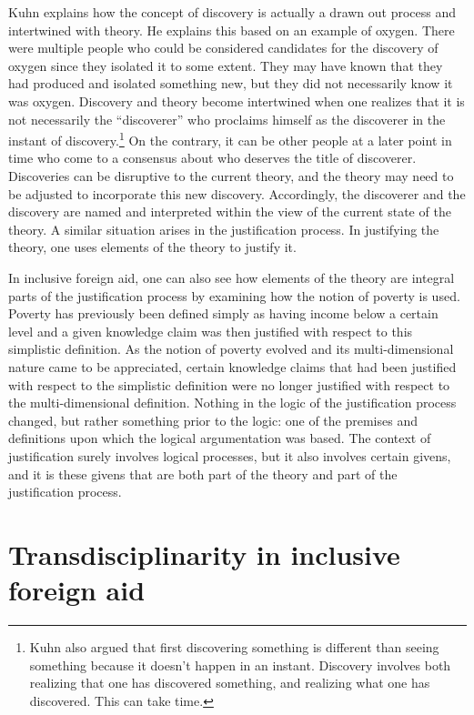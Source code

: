 \documentclass[a4paper]{article}
\begin{document}
Kuhn explains how the concept of discovery is actually a drawn out process and
intertwined with theory. He explains this based on an example of oxygen. There
were multiple people who could be considered candidates for the discovery of
oxygen since they isolated it to some extent. They may have known that they
had produced and isolated something new, but they did not necessarily know it
was oxygen. Discovery and theory become intertwined when one realizes that it
is not necessarily the ``discoverer'' who proclaims himself as the discoverer
in the instant of discovery.\footnote{Kuhn also argued that first discovering
    something is different than seeing something because it doesn't happen in
    an instant. Discovery involves both realizing that one has discovered
something, and realizing what one has discovered. This can take time.} On the
contrary, it can be other people at a later point in time who come to a
consensus about who deserves the title of discoverer. Discoveries can be
disruptive to the current theory, and the theory may need to be adjusted to
incorporate this new discovery. Accordingly, the discoverer and the discovery
are named and interpreted within the view of the current state of the theory.
A similar situation arises in the justification process. In justifying the
theory, one uses elements of the theory to justify it.

In inclusive foreign aid, one can also see how elements of the theory are
integral parts of the justification process by examining how the notion of
poverty is used. Poverty has previously been defined simply as having income
below a certain level and a given knowledge claim was then justified with
respect to this simplistic definition. As the notion of poverty evolved and
its multi-dimensional nature came to be appreciated, certain knowledge claims
that had been justified with respect to the simplistic definition were no
longer justified with respect to the multi-dimensional definition. Nothing in
the logic of the justification process changed, but rather something prior to
the logic: one of the premises and definitions upon which the logical
argumentation was based. The context of justification surely involves logical
processes, but it also involves certain givens, and it is these givens that
are both part of the theory and part of the justification process.


\newpage

\section{Transdisciplinarity in inclusive foreign aid}
\end{document}

